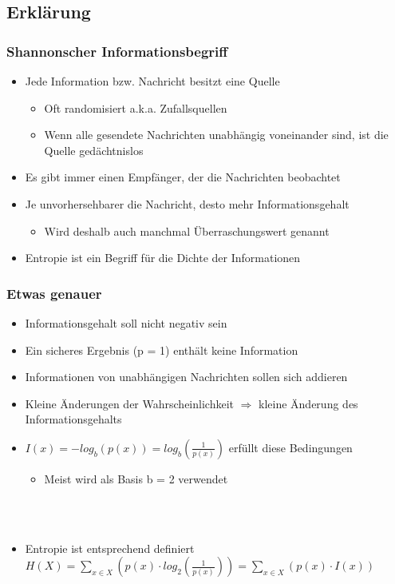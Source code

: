 \subsection{Erklärung}
\begin{frame}
	\frametitle{Shannonscher Informationsbegriff}
	\begin{itemize}
		\item Jede Information bzw. Nachricht besitzt eine Quelle
		\begin{itemize}
			\item Oft randomisiert a.k.a. Zufallsquellen
			\item Wenn alle gesendete Nachrichten unabhängig voneinander sind, ist die Quelle gedächtnislos
		\end{itemize}
		\item Es gibt immer einen Empfänger, der die Nachrichten beobachtet
		\item Je unvorhersehbarer die Nachricht, desto mehr Informationsgehalt
		\begin{itemize}
				\item Wird deshalb auch manchmal Überraschungswert genannt
		\end{itemize}
		\item Entropie ist ein Begriff für die Dichte der Informationen
	\end{itemize}
\end{frame}

\begin{frame}
	\frametitle{Etwas genauer}
	\begin{itemize}
		\item Informationsgehalt soll nicht negativ sein
		\item Ein sicheres Ergebnis (p = 1) enthält keine Information
		\item Informationen von unabhängigen Nachrichten sollen sich addieren
		\item Kleine Änderungen der Wahrscheinlichkeit $\Rightarrow$ kleine Änderung des Informationsgehalts
		\item $I(x) = -log_b(p(x)) = log_b(\frac{1}{p(x)})$ erfüllt diese Bedingungen
		\begin{itemize}
			\item Meist wird als Basis b = 2 verwendet
		\end{itemize}~\\~\\
		\item Entropie ist entsprechend definiert~\\ $H(X) = \sum\limits_{x \in X} (p(x) \cdot log_2(\frac{1}{p(x)})) = \sum\limits_{x \in X} (p(x) \cdot I(x))$
	\end{itemize}
\end{frame}


